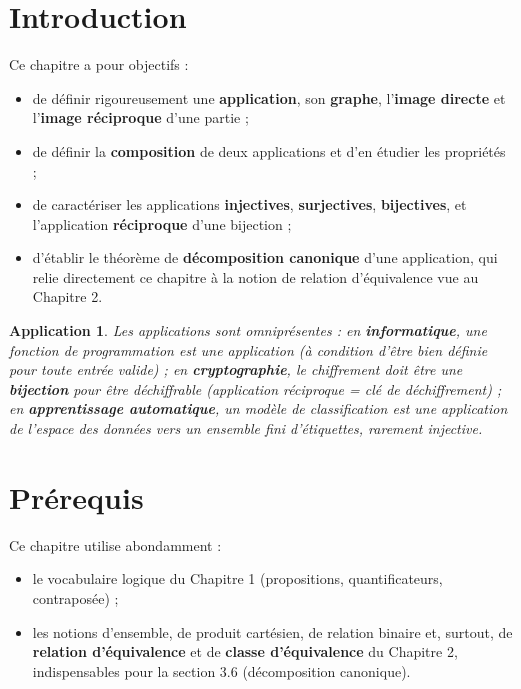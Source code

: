 \documentclass[a4paper,12pt,openany]{book}
\newtheorem{application}{Application}[section]
\begin{document}
\section{Introduction}


Ce chapitre a pour objectifs :
\begin{itemize}
  \item de définir rigoureusement une \textbf{application}, son
  \textbf{graphe}, l'\textbf{image directe} et l'\textbf{image réciproque}
  d'une partie ;
  \item de définir la \textbf{composition} de deux applications et d'en
  étudier les propriétés ;
  \item de caractériser les applications \textbf{injectives},
  \textbf{surjectives}, \textbf{bijectives}, et l'application
  \textbf{réciproque} d'une bijection ;
  \item d'établir le théorème de \textbf{décomposition canonique} d'une
  application, qui relie directement ce chapitre à la notion de relation
  d'équivalence vue au Chapitre 2.
\end{itemize}

\begin{application}
Les applications sont omniprésentes : en \textbf{informatique}, une fonction
de programmation est une application (à condition d'être bien définie pour
toute entrée valide) ; en \textbf{cryptographie}, le chiffrement doit être une
\textbf{bijection} pour être déchiffrable (application réciproque = clé de
déchiffrement) ; en \textbf{apprentissage automatique}, un modèle de
classification est une application de l'espace des données vers un ensemble
fini d'étiquettes, rarement injective.
\end{application}

\section{Prérequis}

Ce chapitre utilise abondamment :
\begin{itemize}
  \item le vocabulaire logique du Chapitre 1 (propositions, quantificateurs,
  contraposée) ;
  \item les notions d'ensemble, de produit cartésien, de relation binaire et,
  surtout, de \textbf{relation d'équivalence} et de \textbf{classe
  d'équivalence} du Chapitre 2, indispensables pour la section 3.6
  (décomposition canonique).
\end{itemize}
\end{document}
